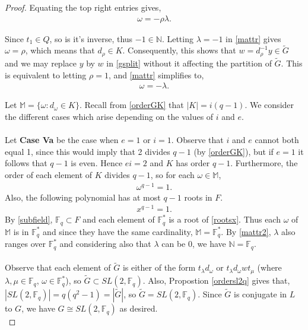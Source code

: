 \documentclass[a4paper , 11pt]{book}
\theoremstyle{definition}
\theoremstyle{remark}
\begin{document}
\begin{proof}
Equating the top right entries gives,
\begin{align}\label{mattr} \omega = -\rho \lambda.
\end{align}

Since $t_1 \in Q$, so is it's inverse, thus $-1 \in \mathbb{N}$. Letting $\lambda = -1$ in \eqref{mattr} gives $\omega = \rho$, which means that $d_\rho \in K$. Consequently, this shows that $w = d_\rho^{-1} y \in {\widetilde{G}}$ and we may replace $y$ by $w$ in \eqref{gsplit} without it affecting the partition of ${\widetilde{G}}$. This is equivalent to letting $\rho = 1$, and \eqref{mattr} simplifies to,
\begin{align}\label{mattr2} \omega = -\lambda.
\end{align}

Let $\mathbb{M} = \{ \omega : d_\omega \in K \}$. Recall from \eqref{orderGK} that $|K| = i(q-1)$. We consider the different cases which arise depending on the values of $i$ and $e$. \\
\\
Let \textbf{Case Va} be the case when $e=1$ or $i = 1$. Observe that $i$ and $e$ cannot both equal 1, since this would imply that 2 divides $q-1$ (by \eqref{orderGK}), but if $e=1$ it follows that $q-1$ is even. Hence $ei = 2$ and $K$ has order $q-1$. Furthermore, the order of each element of $K$ divides $q-1$, so for each $\omega \in \mathbb{M}$,
\begin{align}\label{roots} \omega^{q-1} = 1.
\end{align}
Also, the following polynomial has at most $q-1$ roots in $F$.
\begin{align}\label{rootsx} x^{q-1} = 1.
\end{align}
By \eqref{subfield}, $\mathbb{F}_q \subset F$ and each element of $\mathbb{F}^*_q$ is a root of \eqref{rootsx}. Thus each $\omega$ of $\mathbb{M}$ is in $\mathbb{F}^*_q$ and since they have the same cardinality, $\mathbb{M} = \mathbb{F}^*_q$. By \eqref{mattr2}, $\lambda$ also ranges over $\mathbb{F}^*_q$ and considering also that $\lambda$ can be 0, we have $\mathbb{N} =\mathbb{F}_q$. \\
\\
Observe that each element of ${\widetilde{G}}$ is either of the form $t_\lambda d_\omega$ or $t_\lambda d_\omega w t_\mu$ (where $\lambda, \mu \in \mathbb{F}_q$, $\omega \in \mathbb{F}^*_q$), so ${\widetilde{G}} \subset SL(2,\mathbb{F}_q)$. Also, Propostion \ref{ordersl2q} gives that, $|SL(2,\mathbb{F}_q)| = q(q^2-1) = |{\widetilde{G}}|$, so ${\widetilde{G}} = SL(2,\mathbb{F}_q)$. Since ${\widetilde{G}}$ is conjugate in $L$ to $G$, we have $G \cong SL(2,\mathbb{F}_q)$  as desired. \\

\end{proof}
\end{document}
